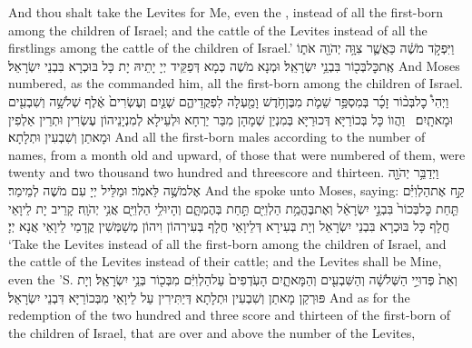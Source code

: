 {And thou shalt take the Levites for Me, even the \lord, instead of all the first-born among the children of Israel; and the cattle of the Levites instead of all the firstlings among the cattle of the children of Israel.’}{}
{וַיִּפְקֹ֣ד מֹשֶׁ֔ה כַּאֲשֶׁ֛ר צִוָּ֥ה יְהֹוָ֖ה אֹת֑וֹ אֶֽת\maqqaf כׇּל\maqqaf בְּכ֖וֹר בִּבְנֵ֥י יִשְׂרָאֵֽל׃}
{וּמְנָא מֹשֶׁה כְּמָא דְּפַקֵּיד יְיָ יָתֵיהּ יָת כָּל בּוּכְרָא בִּבְנֵי יִשְׂרָאֵל׃}
{And Moses numbered, as the \lord\space commanded him, all the first-born among the children of Israel.}{}
{וַיְהִי֩ כׇל\maqqaf בְּכ֨וֹר זָכָ֜ר בְּמִסְפַּ֥ר שֵׁמֹ֛ת מִבֶּן\maqqaf חֹ֥דֶשׁ וָמַ֖עְלָה לִפְקֻדֵיהֶ֑ם שְׁנַ֤יִם וְעֶשְׂרִים֙ אֶ֔לֶף שְׁלֹשָׁ֥ה וְשִׁבְעִ֖ים וּמָאתָֽיִם׃ \petucha }
{וַהֲווֹ כָּל בְּכוֹרַיָּא דְּכוּרַיָּא בְּמִנְיַן שְׁמָהָן מִבַּר יַרְחָא וּלְעֵילָא לְמִנְיָנֵיהוֹן עֶשְׂרִין וּתְרֵין אַלְפִין וּמָאתַן וְשִׁבְעִין וּתְלָתָא׃}
{And all the first-born males according to the number of names, from a month old and upward, of those that were numbered of them, were twenty and two thousand two hundred and threescore and thirteen.}{}
{וַיְדַבֵּ֥ר יְהֹוָ֖ה אֶל\maqqaf מֹשֶׁ֥ה לֵּאמֹֽר׃}
{וּמַלֵּיל יְיָ עִם מֹשֶׁה לְמֵימַר׃}
{And the \lord\space spoke unto Moses, saying:}{}
{קַ֣ח אֶת\maqqaf הַלְוִיִּ֗ם תַּ֤חַת כׇּל\maqqaf בְּכוֹר֙ בִּבְנֵ֣י יִשְׂרָאֵ֔ל וְאֶת\maqqaf בֶּהֱמַ֥ת הַלְוִיִּ֖ם תַּ֣חַת בְּהֶמְתָּ֑ם וְהָיוּ\maqqaf לִ֥י הַלְוִיִּ֖ם אֲנִ֥י יְהֹוָֽה׃}
{קָרֵיב יָת לֵיוָאֵי חֲלָף כָּל בּוּכְרָא בִּבְנֵי יִשְׂרָאֵל וְיָת בְּעִירָא דְּלֵיוָאֵי חֲלָף בְּעִירְהוֹן וִיהוֹן מְשַׁמְּשִׁין קֳדָמַי לֵיוָאֵי אֲנָא יְיָ׃}
{‘Take the Levites instead of all the first-born among the children of Israel, and the cattle of the Levites instead of their cattle; and the Levites shall be Mine, even the \lord’S.}{}
{וְאֵת֙ פְּדוּיֵ֣י הַשְּׁלֹשָׁ֔ה וְהַשִּׁבְעִ֖ים וְהַמָּאתָ֑יִם הָעֹֽדְפִים֙ עַל\maqqaf הַלְוִיִּ֔ם מִבְּכ֖וֹר בְּנֵ֥י יִשְׂרָאֵֽל׃}
{וְיָת פּוּרְקַן מָאתַן וְשִׁבְעִין וּתְלָתָא דְּיַתִּירִין עַל לֵיוָאֵי מִבְּכוֹרַיָּא דִּבְנֵי יִשְׂרָאֵל׃}
{And as for the redemption of the two hundred and three score and thirteen of the first-born of the children of Israel, that are over and above the number of the Levites,}{}
